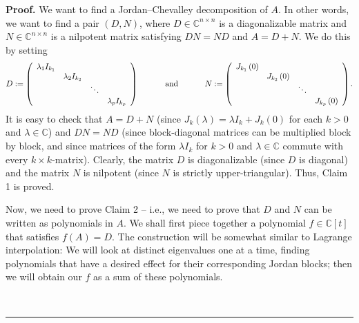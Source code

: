 \documentclass[numbers=enddot,12pt,final,onecolumn,notitlepage]{scrartcl}%
\numberwithin{exer}{subsection}
\theoremstyle{definition}
\newenvironment{proof}[1][Proof]{\noindent\textbf{#1.} }{\ \rule{0.5em}{0.5em}}
\newenvironment{noncompile}{}{}
\begin{document}
\begin{proof}
We want to find a Jordan--Chevalley decomposition of $A$. In other words, we
want to find a pair $\left(  D,N\right)  $, where $D\in\mathbb{C}^{n\times n}$
is a diagonalizable matrix and $N\in\mathbb{C}^{n\times n}$ is a nilpotent
matrix satisfying $DN=ND$ and $A=D+N$. We do this by setting%
\[
D:=\left(
\begin{array}
[c]{cccc}%
\lambda_{1}I_{k_{1}} &  &  & \\
& \lambda_{2}I_{k_{2}} &  & \\
&  & \ddots & \\
&  &  & \lambda_{p}I_{k_{p}}%
\end{array}
\right)  \ \ \ \ \ \ \ \ \ \ \text{and}\ \ \ \ \ \ \ \ \ \ N:=\left(
\begin{array}
[c]{cccc}%
J_{k_{1}}\left(  0\right)  &  &  & \\
& J_{k_{2}}\left(  0\right)  &  & \\
&  & \ddots & \\
&  &  & J_{k_{p}}\left(  0\right)
\end{array}
\right)  .
\]
It is easy to check that $A=D+N$ (since $J_{k}\left(  \lambda\right)  =\lambda
I_{k}+J_{k}\left(  0\right)  $ for each $k>0$ and $\lambda\in\mathbb{C}$) and
$DN=ND$ (since block-diagonal matrices can be multiplied block by block, and
since matrices of the form $\lambda I_{k}$ for $k>0$ and $\lambda\in
\mathbb{C}$ commute with every $k\times k$-matrix). Clearly, the matrix $D$ is
diagonalizable (since $D$ is diagonal) and the matrix $N$ is nilpotent (since
$N$ is strictly upper-triangular). Thus, Claim 1 is proved.

\begin{noncompile}
Now, we need to prove Claim 2 -- i.e., we need to prove that $D$ and $N$ can
be written as polynomials in $A$. We shall first piece together a polynomial
$f\in\mathbb{C}\left[  t\right]  $ that satisfies $f\left(  A\right)  =D$. The
construction will be somewhat similar to Lagrange interpolation: We will look
at distinct eigenvalues one at a time, finding polynomials that have a desired
effect for their corresponding Jordan blocks; then we will obtain our $f$ as a
sum of these polynomials.


\end{noncompile}
\end{proof}
\end{document}
